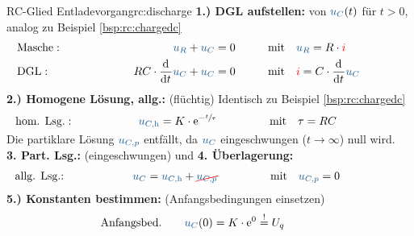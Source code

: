 {\begin{bsp}{RC-Glied Entladevorgang}{rc:discharge}
        \begingroup %
            \addtolength{\jot}{2pt} %
        \textbf{1.) DGL aufstellen:} von $\ecv{u_C}(t)$ für $t>0$, analog zu Beispiel \ref{bsp:rc:chargedc}
            \begin{align*}
            &\text{Masche}:&&&
                \ecv{u_R} + \ecv{u_C}  &= 0&&&
                &\text{mit}\quad \ecv{u_R} = R \cdot \eci{i} \\
            &\text{DGL}:&&&
                RC \cdot \dt \ecv{u_C}  + \ecv{u_C}   &= 0 &&&
                &\text{mit}\quad \eci{i} = C \cdot \dt \ecv{u_C}
            \\[-15pt]&\hphantom{R1ooooooo}&&&\hphantom{L3oooooooooooooooooooo}&\hphantom{R3ooo}&&&&\hphantom{R5oooooooooooooooooooooo}\nonumber%
        \end{align*}%
        \textbf{2.) Homogene Lösung, allg.:} (flüchtig) Identisch zu Beispiel \ref{bsp:rc:chargedc}%
        \begin{align*}%
            &\text{hom. Lsg.}:&&&
                \ecv{u_{C,\mathrm{h}}} = K \cdot \mathrm{e}^{-\sfrac{t}{\tau}}&&&&
                &\text{mit}\quad \tau = RC
            \\[-15pt]&\hphantom{R1ooooooo}&&&\hphantom{L3oooooooooooooooooooo}&\hphantom{R3ooo}&&&&\hphantom{R5oooooooooooooooooooooo}\nonumber%
        \end{align*}%
        Die partiklare Lösung $\ecv{u_{C,p}}$ entfällt, da $\ecv{u_C}$ eingeschwungen ($t \to \infty$) null wird.\\[6pt]%
        \textbf{3. Part. Lsg.:} (eingeschwungen) und \textbf{4. Überlagerung:}%
        \begin{align*}%
            &\text{allg. Lsg.:}&&&
                \ecv{u_C} &= \ecv{u_{C,\mathrm{h}}} + \redcancel{\ecv{u_{C,p}}}&&&
                &\text{mit}\quad \ecv{u_{C,p}}=0
            \\[-15pt]&\hphantom{R1oooooooooooo}&&&\hphantom{L3ooo}&\hphantom{R3oooooooooooooooo}&&&&\hphantom{R5oooooooooooooooooooooo}\nonumber%
        \end{align*}%
        \textbf{5.) Konstanten bestimmen:} (Anfangsbedingungen einsetzen)%
        \begin{align*}%
            &\text{Anfangsbed.}&&&
                \ecv{u_C}(0) &= K \cdot \mathrm{e}^{0} \overset{!}{=} U_q &&&&

\end{align*}
\end{bsp}}
